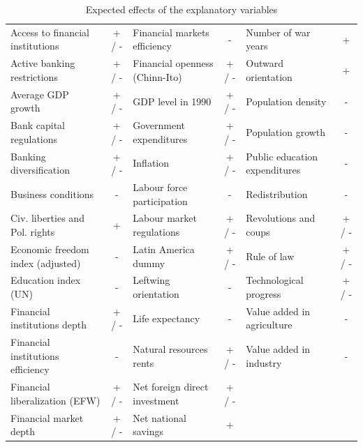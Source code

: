 \begin{refsection}
\begin{subappendices}
    \begin{landscape}
    \centering
    \setlength\tabcolsep{6pt}
    \begin{table}	
    \footnotesize
    \caption{Expected effects of the explanatory variables}
    \label{ch3tab:exp_eff}
    \begin{tabular}{lc|lc|lc}
      \toprule
      Access to financial institutions & + / - & Financial markets efficiency 	& - 	& Number of war years & +			\\ 
      Active banking restrictions 	   & + / - & Financial openness (Chinn-Ito) & + / - & Outward orientation & + 			\\ 
      Average GDP growth 			   & + / - & GDP level in 1990 				& + / - & Population density & - 			\\ 
      Bank capital regulations 		   & + / - & Government expenditures 		& + / - & Population growth & -  			\\ 
      Banking diversification 		   & + / - & Inflation 						& + / - & Public education expenditures & - \\ 
      Business conditions 			   & - 	   & Labour force participation 	& - 	& Redistribution & - 				\\ 
      Civ. liberties and Pol. rights   & + 	   & Labour market regulations 		& + / - & Revolutions and coups & + / - 	\\ 
      Economic freedom index (adjusted) & -    & Latin America dummy			& + / - & Rule of law & + / - 				\\ 
      Education index (UN) 			   & - 	   & Leftwing orientation			& - 	& Technological progress & + / - 	\\ 
      Financial institutions depth 	   & + / - & Life expectancy 				& - 	& Value added in agriculture & - 	\\ 
      Financial institutions efficiency & -    & Natural resources rents 		& + / - & Value added in industry & - 		\\ 
      Financial liberalization (EFW)   & + / - & Net foreign direct investment  & + / - & 									\\ 
      Financial market depth 		   & + / - & Net national savings 			& + 	& 									\\ 
       \bottomrule
    \end{tabular}
    \end{table}
    \end{landscape}
    \clearpage
    

\end{subappendices}
\end{refsection}
